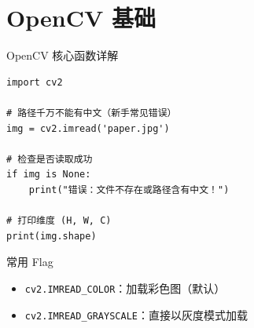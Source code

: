 
\section{OpenCV 基础}

\begin{frame}[fragile]{OpenCV 核心函数详解}
	\begin{lstlisting}[title={图像读取的隐患}]
import cv2

# 路径千万不能有中文（新手常见错误）
img = cv2.imread('paper.jpg')

# 检查是否读取成功
if img is None:
    print("错误：文件不存在或路径含有中文！")

# 打印维度 (H, W, C)
print(img.shape)
	\end{lstlisting}

	\begin{block}{常用 Flag}
		\begin{itemize}
			\item \texttt{cv2.IMREAD\_COLOR}：加载彩色图（默认）
			\item \texttt{cv2.IMREAD\_GRAYSCALE}：直接以灰度模式加载
		\end{itemize}
	\end{block}
\end{frame}

